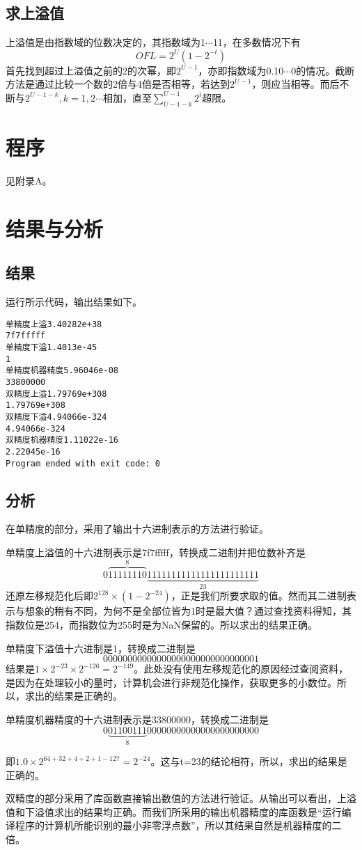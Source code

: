 \documentclass[a4paper,11pt,onecolumn,twoside]{article}
\begin{document}
\subsection{求上溢值}
上溢值是由指数域的位数决定的，其指数域为1$\cdots$11，在多数情况下有$$OFL=2^{U}(1-2^{-t})$$首先找到超过上溢值之前的2的次幂，即$2^{U-1}$，亦即指数域为0.10$\cdots$0的情况。截断方法是通过比较一个数的2倍与4倍是否相等，若达到$2^{U-1}$，则应当相等。而后不断与$2^{U-1-k}, k=1,2\cdots$相加，直至$\sum_{U-1-k}^{U-1}2^{i}$超限。
\section{程序}
见附录A。
\section{结果与分析}
\subsection{结果}
运行所示代码，输出结果如下。
\begin{lstlisting}
单精度上溢3.40282e+38
7f7fffff
单精度下溢1.4013e-45
1
单精度机器精度5.96046e-08
33800000
双精度上溢1.79769e+308
1.79769e+308
双精度下溢4.94066e-324
4.94066e-324
双精度机器精度1.11022e-16
2.22045e-16
Program ended with exit code: 0
\end{lstlisting}
\subsection{分析}
在单精度的部分，采用了输出十六进制表示的方法进行验证。\par  单精度上溢值的十六进制表示是7f7fffff，转换成二进制并把位数补齐是$$0\overbrace{11111110}^{8}\underbrace{11111111111111111111111}_{23}$$还原左移规范化后即$2^{128}\times(1-2^{-24})$，正是我们所要求取的值。然而其二进制表示与想象的稍有不同，为何不是全部位皆为1时是最大值？通过查找资料得知，其指数位是254，而指数位为255时是为NaN保留的。所以求出的结果正确。\par 单精度下溢值十六进制是1，转换成二进制是$$00000000000000000000000000000001$$结果是$1\times 2^{-23}\times 2^{-126}=2^{-149}$。此处没有使用左移规范化的原因经过查阅资料，是因为在处理较小的量时，计算机会进行非规范化操作，获取更多的小数位。所以，求出的结果是正确的。\par
单精度机器精度的十六进制表示是33800000，转换成二进制是$$0\underbrace{01100111}_{8}00000000000000000000000$$\par 即$1.0\times 2^{64+32+4+2+1-127}=2^{-24}$。这与t=23的结论相符，所以，求出的结果是正确的。\par
双精度的部分采用了库函数直接输出数值的方法进行验证。从输出可以看出，上溢值和下溢值求出的结果均正确。而我们所采用的输出机器精度的库函数是“运行编译程序的计算机所能识别的最小非零浮点数”，所以其结果自然是机器精度的二倍。
\end{document}
